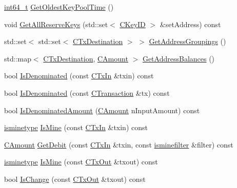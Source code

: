 \begin{DoxyCompactItemize}
\item 
\hyperlink{stdint_8h_adec1df1b8b51cb32b77e5b86fff46471}{int64\+\_\+t} \hyperlink{class_c_wallet_a2555a9442e58b3c5593fef21f1b39d2d}{Get\+Oldest\+Key\+Pool\+Time} ()
\item 
void \hyperlink{class_c_wallet_afb9667058b54ae153b0897684ddb9f20}{Get\+All\+Reserve\+Keys} (std\+::set$<$ \hyperlink{class_c_key_i_d}{C\+Key\+I\+D} $>$ \&set\+Address) const 
\item 
std\+::set$<$ std\+::set$<$ \hyperlink{keystore_8h_a8f46ecba0ddeb036be6b58d6ed1909cd}{C\+Tx\+Destination} $>$ $>$ \hyperlink{class_c_wallet_a8eacbac6ad3697d90b98dfe02632f8ef}{Get\+Address\+Groupings} ()
\item 
std\+::map$<$ \hyperlink{keystore_8h_a8f46ecba0ddeb036be6b58d6ed1909cd}{C\+Tx\+Destination}, \hyperlink{amount_8h_a4eaf3a5239714d8c45b851527f7cb564}{C\+Amount} $>$ \hyperlink{class_c_wallet_adf2b4ac337ddb271555985cec82e43e6}{Get\+Address\+Balances} ()
\item 
bool \hyperlink{class_c_wallet_aa5918d83031eb5df530bf8c129581ef3}{Is\+Denominated} (const \hyperlink{class_c_tx_in}{C\+Tx\+In} \&txin) const 
\item 
bool \hyperlink{class_c_wallet_aecc541d4905526a112beb1b66d8d2aca}{Is\+Denominated} (const \hyperlink{class_c_transaction}{C\+Transaction} \&tx) const 
\item 
bool \hyperlink{class_c_wallet_accb0e427b9b9d2e1ddc200feb2a35e68}{Is\+Denominated\+Amount} (\hyperlink{amount_8h_a4eaf3a5239714d8c45b851527f7cb564}{C\+Amount} n\+Input\+Amount) const 
\item 
\hyperlink{script_8h_a66f67ca6dd4cabac4eea13042b18e20d}{isminetype} \hyperlink{class_c_wallet_ab7cc8fd8859fecc6ed768dacb5642c5e}{Is\+Mine} (const \hyperlink{class_c_tx_in}{C\+Tx\+In} \&txin) const 
\item 
\hyperlink{amount_8h_a4eaf3a5239714d8c45b851527f7cb564}{C\+Amount} \hyperlink{class_c_wallet_a41642840b6efb255876460758eaaa2af}{Get\+Debit} (const \hyperlink{class_c_tx_in}{C\+Tx\+In} \&txin, const \hyperlink{script_8h_aaa5e1639d76aef50f70532acc3302c4b}{isminefilter} \&filter) const 
\item 
\hyperlink{script_8h_a66f67ca6dd4cabac4eea13042b18e20d}{isminetype} \hyperlink{class_c_wallet_ae9e07aa7d322a9434dc4d020bd5e31f0}{Is\+Mine} (const \hyperlink{class_c_tx_out}{C\+Tx\+Out} \&txout) const 
\item 
bool \hyperlink{class_c_wallet_a0864e64299906f8ba499510d12125a23}{Is\+Change} (const \hyperlink{class_c_tx_out}{C\+Tx\+Out} \&txout) const 

\end{DoxyCompactItemize}
